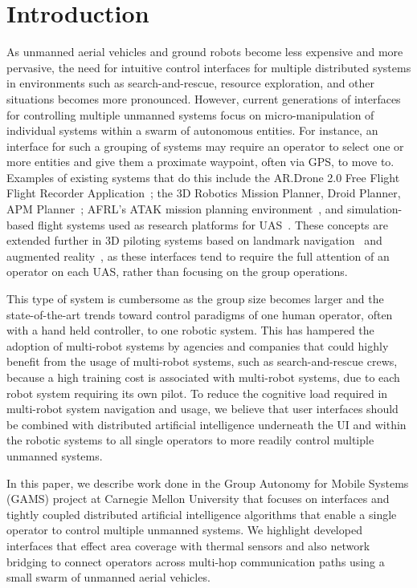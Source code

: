 \documentclass{sig-alternate-ipsn13}
\begin{document}
\section{Introduction}
\label{sec:introduction}

As unmanned aerial vehicles and ground robots become less expensive and more
pervasive, the need for intuitive control interfaces for multiple distributed
systems in environments such as search-and-rescue, resource exploration, and
other situations becomes more pronounced. However, current generations of
interfaces for controlling multiple unmanned systems focus on micro-manipulation
of individual systems within a swarm of autonomous entities. For instance, an
interface for such a grouping of systems may require an operator to select one
or more entities and give them a proximate waypoint, often via GPS, to move to.
Examples of existing systems that do this include the AR.Drone 2.0 Free Flight
Flight Recorder Application~\cite{irizarry2012usability};
the 3D Robotics Mission Planner, Droid Planner,
APM Planner~\cite{arora2013development}; AFRL's ATAK mission
planning environment~\cite{gillen2012beyond}, and simulation-based flight
systems used as research platforms for UAS~\cite{puls2009gps,chao2007autopilots}.
These concepts are extended further in 3D piloting systems based on landmark
navigation~\cite{ranft20133d} and augmented reality~\cite{kochflying}, as
these interfaces tend to require the full attention
of an operator on each UAS, rather than focusing on the group operations.

This type of system is cumbersome as the group size becomes larger and the
state-of-the-art trends toward control paradigms of one human operator, often
with a hand held controller, to one robotic system. This has hampered the
adoption of multi-robot systems by agencies and companies that could highly
benefit from the usage of multi-robot systems, such as search-and-rescue crews,
because a high training cost is associated with multi-robot systems, due to each
robot system requiring its own pilot. To reduce the cognitive load required in
multi-robot system navigation and usage, we believe that user interfaces should
be combined with distributed artificial intelligence underneath the UI and
within the robotic systems to all single operators to more readily control
multiple unmanned systems.

In this paper, we describe work done in the Group Autonomy for Mobile Systems
(GAMS) project at Carnegie Mellon University that focuses on interfaces and
tightly coupled distributed artificial intelligence algorithms that enable a single
operator to control multiple unmanned systems. We highlight developed interfaces
that effect area coverage with thermal sensors and also network bridging to
connect operators across multi-hop communication paths using a small swarm of
unmanned aerial vehicles.
\end{document}

